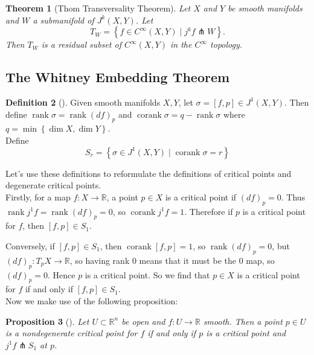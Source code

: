 \documentclass[reqno]{amsart}
\newtheorem{theorem}{Theorem}[section]
\newtheorem{proposition}[theorem]{Proposition}
\theoremstyle{definition}
\newtheorem{definition}[theorem]{Definition}
\theoremstyle{remark}
\DeclareMathOperator{\corank}{corank}
\DeclareMathOperator{\rank}{rank}
\begin{document}
\begin{theorem}[Thom Transversality Theorem]
    Let $X$ and $Y$ be smooth manifolds and
    $W$ a submanifold of $J^{k}(X,Y)$. Let
    \[
    T_W = \left\{ f \in 
    C^{\infty}(X,Y)  \mid j^{k}f \pitchfork W \right\} .
    \] 
    Then $T_W$ is a residual subset of 
    $C^{\infty}(X,Y)$ in the $C^{\infty}$ topology.
\end{theorem}


\subsection{The Whitney Embedding Theorem}

\begin{definition}[]
    Given smooth manifolds $X,Y$, let
    $\sigma = \left[ f,p \right] 
    \in J^{1}(X,Y)$. Then define
    $\rank \sigma = \rank \left( df \right)_p$ and
    $\corank \sigma = q - \rank \sigma$ where
    $q = \min \left\{ \dim X, \dim Y \right\} $.\\
    Define
    \[
    S_r = \left\{ \sigma \in J^{1}(X,Y)  \mid 
    \corank \sigma = r \right\} 
    \] 
\end{definition}

Let's use these definitions to
reformulate the definitions of critical points and
degenerate critical points.\\

Firstly, for a map $f \colon X \to \mathbb{R}$, a
point $p \in X$ is a critical point if
$(df)_p = 0$. Thus
$\rank j^{1} f = \rank (df)_p = 0$, so
$\corank j^{1}f = 1$. Therefore
 if $p$ is a critical point for  $f$, then
 $\left[ f,p \right] \in S_1$.

 Conversely, if
 $\left[ f,p \right] \in S_1$, then
 $\corank \left[ f,p \right] = 1$, so
 $\rank \left( df \right)_p = 0$, but
 $\left( df \right)_p \colon T_p X \to \mathbb{R}$, so
 having rank $0$ means that it must be the $0$ map, so
 $(df)_p = 0$. Hence $p$ is a critical point. So we find that
 $p \in X$ is a critical point for $f$ if and only if
 $\left[ f,p \right] \in S_1$.\\
 \linebreak
 Now we make use of the following proposition:
 \begin{proposition}[]\label{Nondegenerate-Equiv-Jets}
     Let $U \subset \mathbb{R}^{n}$ be open
     and $f \colon U \to \mathbb{R}$ smooth. Then
     a point $p \in U$ is a nondegenerate critical point
     for $f$ if and only if 
     $p$ is a critical point and
     $j^{1}f \pitchfork S_1$ at $p$.
 \end{proposition}
\end{document}
